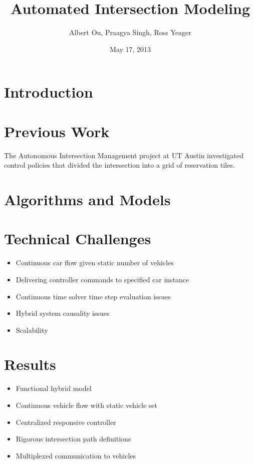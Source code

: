 \documentclass[11pt,letterpaper]{article}
\title{Automated Intersection Modeling}
\author{Albert Ou, Praagya Singh, Ross Yeager}
\date{May 17, 2013}
\begin{document}
\maketitle

\section{Introduction}


\section{Previous Work}

The Autonomous Intersection Management project at UT Austin investigated
control policies that divided the intersection into a grid of reservation
tiles.\cite{Dresner}

\section{Algorithms and Models}





\section{Technical Challenges}

\begin{itemize}
\setlength{\itemsep}{0pt}
\setlength{\parskip}{0pt}
\item Continuous car flow given static number of vehicles
\item Delivering controller commands to specified car instance
\item Continuous time solver time step evaluation issues
\item Hybrid system causality issues
\item Scalability
\end{itemize}

\section{Results}

\begin{itemize}
\setlength{\itemsep}{0pt}
\setlength{\parskip}{0pt}
\item Functional hybrid model
\item Continuous vehicle flow with static vehicle set
\item Centralized responsive controller
\item Rigorous intersection path definitions
\item Multiplexed communication to vehicles
\end{itemize}
\end{document}
